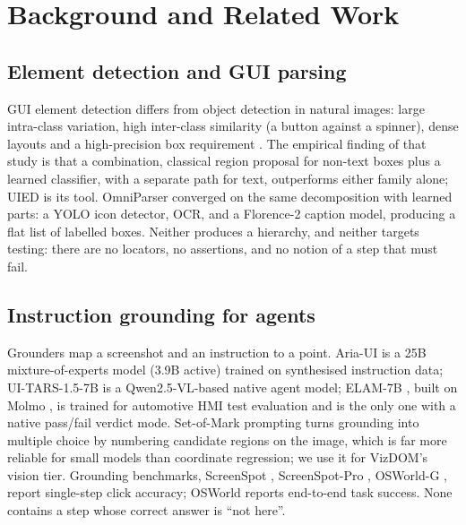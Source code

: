 \documentclass[conference]{IEEEtran}
\begin{document}
\section{Background and Related Work}
\label{sec:related}

\subsection{Element detection and GUI parsing}
GUI element detection differs from object detection in natural images: large intra-class variation, high inter-class similarity (a button against a spinner), dense layouts and a high-precision box requirement \cite{chen2020gui}. The empirical finding of that study is that a combination, classical region proposal for non-text boxes plus a learned classifier, with a separate path for text, outperforms either family alone; UIED \cite{xie2020uied} is its tool. OmniParser \cite{omniparser2024} converged on the same decomposition with learned parts: a YOLO icon detector, OCR, and a Florence-2 \cite{florence2} caption model, producing a flat list of labelled boxes. Neither produces a hierarchy, and neither targets testing: there are no locators, no assertions, and no notion of a step that must fail.

\subsection{Instruction grounding for agents}
Grounders map a screenshot and an instruction to a point. Aria-UI \cite{ariaui2024} is a 25B mixture-of-experts model (3.9B active) trained on synthesised instruction data; UI-TARS-1.5-7B \cite{uitars2025} is a Qwen2.5-VL-based \cite{qwen25vl} native agent model; ELAM-7B \cite{elam7b}, built on Molmo \cite{molmo2024}, is trained for automotive HMI test evaluation and is the only one with a native pass/fail verdict mode. Set-of-Mark prompting \cite{som2023} turns grounding into multiple choice by numbering candidate regions on the image, which is far more reliable for small models than coordinate regression; we use it for VizDOM's vision tier. Grounding benchmarks, ScreenSpot \cite{seeclick2024}, ScreenSpot-Pro \cite{screenspotpro2025}, OSWorld-G \cite{jedi2025}, report single-step click accuracy; OSWorld \cite{osworld2024} reports end-to-end task success. None contains a step whose correct answer is ``not here''.
\end{document}
